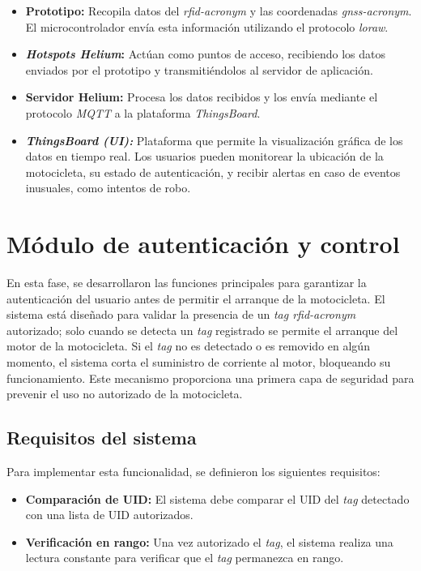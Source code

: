 \begin{itemize}
    \item \textbf{Prototipo:} Recopila datos del \textit{\acrshort{rfid-acronym}} y las coordenadas \textit{\acrshort{gnss-acronym}}. El microcontrolador envía esta información utilizando el protocolo \textit{\acrshort{loraw}}.
    \item \textbf{\textit{Hotspots Helium}:} Actúan como puntos de acceso, recibiendo los datos enviados por el prototipo y transmitiéndolos al servidor de aplicación.
    \item \textbf{Servidor Helium:} Procesa los datos recibidos y los envía mediante el protocolo \textit{MQTT} a la plataforma \textit{ThingsBoard}.
    \item \textbf{\textit{ThingsBoard (UI):}} Plataforma que permite la visualización gráfica de los datos en tiempo real. Los usuarios pueden monitorear la ubicación de la motocicleta, su estado de autenticación, y recibir alertas en caso de eventos inusuales, como intentos de robo.
\end{itemize}


\section{Módulo de autenticación y control}

En esta fase, se desarrollaron las funciones principales para garantizar la autenticación del usuario antes de permitir el arranque de la motocicleta. El sistema está diseñado para validar la presencia de un \textit{tag \acrshort{rfid-acronym}} autorizado; solo cuando se detecta un \textit{tag} registrado se permite el arranque del motor de la motocicleta. Si el \textit{tag} no es detectado o es removido en algún momento, el sistema corta el suministro de corriente al motor, bloqueando su funcionamiento. Este mecanismo proporciona una primera capa de seguridad para prevenir el uso no autorizado de la motocicleta.

\subsection{Requisitos del sistema}

Para implementar esta funcionalidad, se definieron los siguientes requisitos:

\begin{itemize}
    \item \textbf{Comparación de UID:} El sistema debe comparar el UID del \textit{tag} detectado con una lista de UID autorizados.
    \item \textbf{Verificación en rango:} Una vez autorizado el \textit{tag}, el sistema realiza una lectura constante para verificar que el \textit{tag} permanezca en rango.
\end{itemize}


